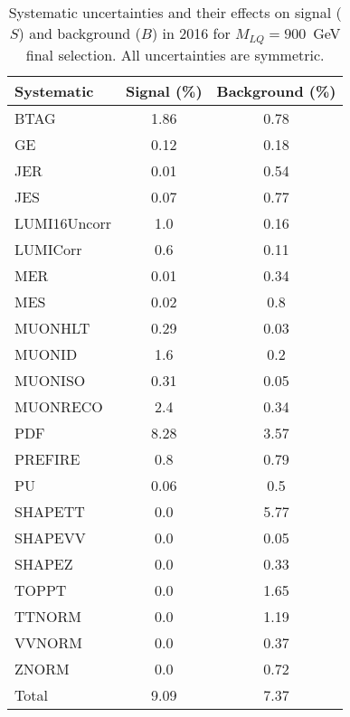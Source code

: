 \begin{table}[htbp]
\begin{center}
\caption{Systematic uncertainties and their effects on signal ($S$) and background ($B$) in 2016 for $M_{LQ}=900$~GeV final selection. All uncertainties are symmetric.}
\begin{tabular}{lcc}
\hline\hline
Systematic & Signal (\%) & Background (\%) \\ \hline 
BTAG & 1.86 & 0.78\\ 
GE & 0.12 & 0.18\\ 
JER & 0.01 & 0.54\\ 
JES & 0.07 & 0.77\\ 
LUMI16Uncorr & 1.0 & 0.16\\ 
LUMICorr & 0.6 & 0.11\\ 
MER & 0.01 & 0.34\\ 
MES & 0.02 & 0.8\\ 
MUONHLT & 0.29 & 0.03\\ 
MUONID & 1.6 & 0.2\\ 
MUONISO & 0.31 & 0.05\\ 
MUONRECO & 2.4 & 0.34\\ 
PDF & 8.28 & 3.57\\ 
PREFIRE & 0.8 & 0.79\\ 
PU & 0.06 & 0.5\\ 
SHAPETT & 0.0 & 5.77\\ 
SHAPEVV & 0.0 & 0.05\\ 
SHAPEZ & 0.0 & 0.33\\ 
TOPPT & 0.0 & 1.65\\ 
TTNORM & 0.0 & 1.19\\ 
VVNORM & 0.0 & 0.37\\ 
ZNORM & 0.0 & 0.72\\ 
Total & 9.09 & 7.37\\ \hline \hline
\end{tabular}
\label{tab:SysUncertainties_uujj_900}
\end{center}
\end{table}

